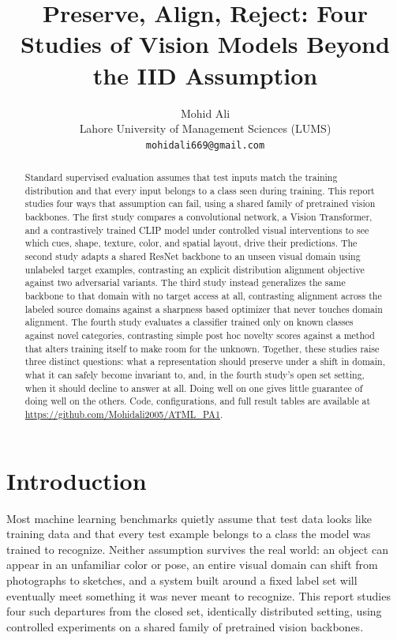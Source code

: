 \documentclass{article}
\title{Preserve, Align, Reject: Four Studies of Vision Models Beyond the IID Assumption}
\author{
  Mohid Ali \\
  Lahore University of Management Sciences (LUMS) \\
  \texttt{mohidali669@gmail.com}
}
\begin{document}
\maketitle

\begin{abstract}
Standard supervised evaluation assumes that test inputs match the training
distribution and that every input belongs to a class seen during training.
This report studies four ways that assumption can fail, using a shared
family of pretrained vision backbones. The first study compares a
convolutional network, a Vision Transformer, and a contrastively trained
CLIP model under controlled
visual interventions to see which cues, shape, texture, color, and spatial
layout, drive their predictions. The second study adapts a shared
ResNet backbone to an unseen visual domain using unlabeled target examples,
contrasting an explicit distribution alignment objective against two
adversarial variants. The third study instead generalizes the same backbone
to that domain with no target access at all, contrasting alignment across
the labeled source domains against a sharpness based optimizer that never
touches domain alignment. The fourth study evaluates a classifier trained
only on known classes against novel categories, contrasting simple
post hoc novelty scores against a method that alters training itself to
make room for the unknown. Together, these studies raise three distinct
questions: what a representation should preserve under a shift in domain,
what it can safely become invariant to, and, in the fourth study's
open set setting, when it should decline to answer at all. Doing well on
one gives little guarantee of doing well on the others. Code,
configurations, and full result tables are available at
\url{https://github.com/Mohidali2005/ATML_PA1}.
\end{abstract}

\section{Introduction}
\label{sec:intro}

Most machine learning benchmarks quietly assume that test data looks like
training data and that every test example belongs to a class the model was
trained to recognize. Neither assumption survives the real world: an object can
appear in an unfamiliar color or pose, an entire visual domain can shift
from photographs to sketches, and a system built around a fixed label set
will eventually meet something it was never meant to recognize. This report
studies four such departures from the closed set, identically distributed
setting, using controlled experiments on a shared family of pretrained
vision backbones.
\end{document}
